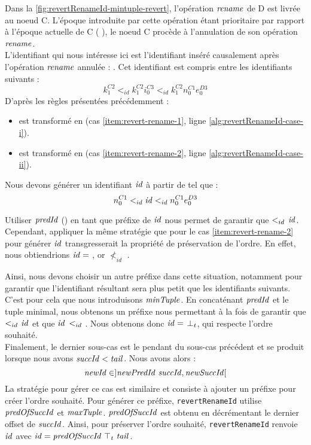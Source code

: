 Dans la \autoref{fig:revertRenameId-mintuple-revert}, l'opération $\mathit{rename}$ de D est livrée au noeud C.
L'époque introduite par cette opération étant prioritaire par rapport à l'époque actuelle de C ( \lepoch {}), le noeud C procède à l'annulation de son opération $\mathit{rename}$.\\

L'identifiant qui nous intéresse ici est l'identifiant inséré causalement après l'opération $\mathit{rename}$ annulée : .
Cet identifiant est compris entre les identifiants suivants :
\[k^{C2}_{1} <_{id} k^{C2}_{1}i^{C3}_{0} <_{id} k^{C2}_{1}n^{C1}_{0}e^{D3}_{0}\]
D'après les règles présentées précédemment :
\begin{itemize}
  \item {} est transformé en  (cas \ref{item:revert-rename-1}, ligne \ref{alg:revertRenameId-case-i}).
  \item {} est transformé en  (cas \ref{item:revert-rename-2}, ligne \ref{alg:revertRenameId-case-ii}).
\end{itemize}
Nous devons générer un identifiant $\mathit{id}$ à partir de  tel que :
\[n^{C1}_{0} <_{id} \mathit{id} <_{id} n^{C1}_{0}e^{D3}_{0}\]

Utiliser $\mathit{predId}$ () en tant que préfixe de $\mathit{id}$ nous permet de garantir que  $<_{id}$ $\mathit{id}$.
Cependant, appliquer la même stratégie que pour le cas \ref{item:revert-rename-2} pour générer $\mathit{id}$ transgresserait la propriété de préservation de l'ordre.
En effet, nous obtiendrions $\mathit{id} = $ , or  $\nless_{id}$ .

Ainsi, nous devons choisir un autre préfixe dans cette situation, notamment pour garantir que l'identifiant résultant sera plus petit que les identifiants suivants.
C'est pour cela que nous introduisons $\mathit{minTuple}$.
En concaténant $\mathit{predId}$ et le tuple minimal, nous obtenons un préfixe nous permettant à la fois de garantir que  $<_{id}$ $\mathit{id}$ et que $\mathit{id}$ $<_{id}$ .
Nous obtenons donc $\mathit{id} = $ $\bot_t$, qui respecte l'ordre souhaité.\\

Finalement, le dernier sous-cas est le pendant du sous-cas précédent et se produit lorsque nous avons $\mathit{succId} < \mathit{tail}$.
Nous avons alors :
\[\mathit{newId} \in ]\mathit{newPredId~succId}, \mathit{newSuccId}[\]
La stratégie pour gérer ce cas est similaire et consiste à ajouter un préfixe pour créer l'ordre souhaité.
Pour générer ce préfixe, \texttt{revertRenameId} utilise  $\mathit{predOfSuccId}$ et $\mathit{maxTuple}$.
$\mathit{predOfSuccId}$ est obtenu en décrémentant le dernier offset de $\mathit{succId}$.
Ainsi, pour préserver l'ordre souhaité, \texttt{revertRenameId} renvoie $\mathit{id}$ avec $\mathit{id} = \mathit{predOfSuccId~\top_t~tail}$.\\

